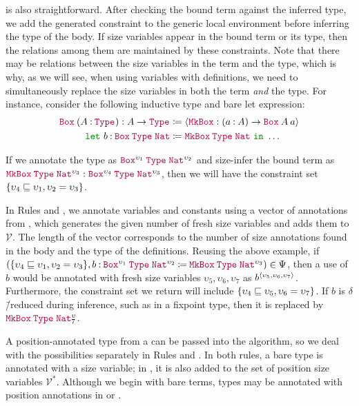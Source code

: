  is also straightforward.
After checking the bound term against the inferred type, we add the generated constraint to the generic local environment before inferring the type of the body.
If size variables appear in the bound term or its type, then the relations among them are maintained by these constraints.
Note that there may be relations between the size variables in the term and the type, which is why, as we will see, when using variables with definitions, we need to simultaneously replace the size variables in both the term \textit{and} the type.
For instance, consider the following inductive type and bare let expression:
\begin{align*}
  \app{\Box}{(\assm{A}{\Type{}})} : A \to \Type{} &\coloneqq
    \seq{\MkBox : (\assm{a}{A}) \to \app{\Box}{A}{a}} \\
  \letin{b}{\app{\Box}{\Type{}}{\Nat}&}{\app{\MkBox}{\Type{}}{\Nat}}{\dots}
\end{align*}

If we annotate the type as $\app{\Box^{\upsilon_1}}{\Type{}}{\Nat^{\upsilon_2}}$ and size-infer the bound term as $\app{\MkBox}{\Type{}}{\Nat^{\upsilon_3}} : \app{\Box^{\upsilon_4}}{\Type{}}{\Nat^{\upsilon_3}}$, then we will have the constraint set $\{\upsilon_4 \sqsubseteq \upsilon_1, \upsilon_2 = \upsilon_3\}$.

In Rules  and , we annotate variables and constants using a vector of annotations from \fresh, which generates the given number of fresh size variables and adds them to $\mathcal{V}$.
The length of the vector corresponds to the number of size annotations found in the body and the type of the definitions.
Reusing the above example, if $(\set{\upsilon_4 \sqsubseteq \upsilon_1, \upsilon_2 = \upsilon_3}, \defn{b}{\app{\Box^{\upsilon_1}}{\Type{}}{\Nat^{\upsilon_2}}}{\app{\MkBox}{\Type{}}{\Nat^{\upsilon_3}}}) \in \Psi$, then a use of $b$ would be annotated with fresh size variables $\upsilon_5, \upsilon_6, \upsilon_7$ as $b^{\langle\upsilon_5, \upsilon_6, \upsilon_7\rangle}$.
Furthermore, the constraint set we return will include $\{\upsilon_4 \sqsubseteq \upsilon_5, \upsilon_6 = \upsilon_7\}$.
If $b$ is $\delta$\=/reduced during inference, such as in a fixpoint type, then it is replaced by $\app{\MkBox}{\Type{}}{\Nat^\upsilon_7}$.

A position-annotated type from a \cofixpoint can be passed into the algorithm, so we deal with the possibilities separately in Rules  and .
In both rules, a bare \coinductive type is annotated with a size variable; in , it is also added to the set of position size variables $\mathcal{V}^*$.
Although we begin with bare terms, \coinductive types may be annotated with position annotations in  or .

